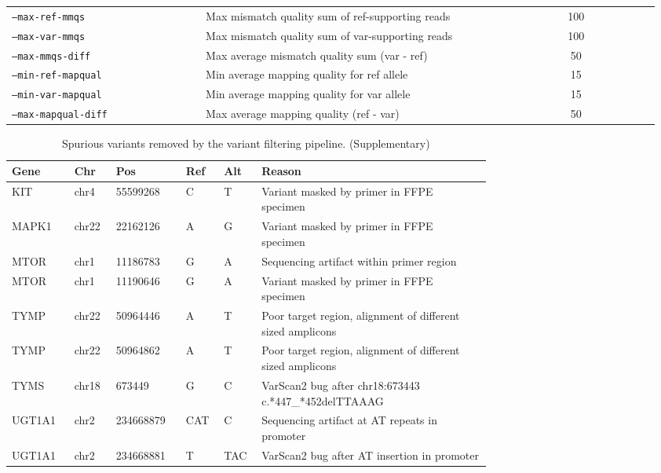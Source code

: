 \documentclass{bmcart}
\begin{document}
\begin{backmatter}
\begin{table}[H]
\begin{tabular}{p{0.3\linewidth}p{0.56\linewidth}cp{0.1\linewidth}}
        \\
        \texttt{--max-ref-mmqs} & Max mismatch quality sum of ref-supporting reads & 100
        \\
        \texttt{--max-var-mmqs} & Max mismatch quality sum of var-supporting reads & 100
        \\
        \texttt{--max-mmqs-diff} & Max average mismatch quality sum (var - ref) & 50
        \\
        \texttt{--min-ref-mapqual} & Min average mapping quality for ref allele & 15
        \\
        \texttt{--min-var-mapqual} & Min average mapping quality for var allele & 15
        \\
        \texttt{--max-mapqual-diff} & Max average mapping quality (ref - var) & 50
        \\
				\hline
      \end{tabular}
\end{table}

\begin{longtable}{p{0.08\linewidth}p{0.05\linewidth}p{0.1\linewidth}p{0.04\linewidth}p{0.04\linewidth}p{0.4\linewidth}}
    \caption{Spurious variants removed by the variant filtering pipeline. (Supplementary)}
    \label{spurious_calls}
        \\
        \hline
        Gene & Chr & Pos & Ref & Alt & Reason
				\\
				\hline
				KIT & chr4 & 55599268 & C & T & Variant masked by primer in FFPE specimen
				\\
        MAPK1 & chr22 & 22162126 & A & G & Variant masked by primer in FFPE specimen
        \\
        MTOR & chr1 & 11186783 & G & A & Sequencing artifact within primer region
        \\
        MTOR & chr1 & 11190646 & G & A & Variant masked by primer in FFPE specimen
        \\
        TYMP & chr22 & 50964446 & A & T & Poor target region, alignment of different sized amplicons
        \\
        TYMP & chr22 & 50964862 & A & T & Poor target region, alignment of different sized amplicons
        \\
        TYMS & chr18 & 673449 & G & C & VarScan2 bug after chr18:673443 c.*447\_*452delTTAAAG
        \\
        UGT1A1 & chr2 & 234668879 & CAT & C & Sequencing artifact at AT repeats in promoter
        \\
        UGT1A1 & chr2 & 234668881 & T & TAC & VarScan2 bug after AT insertion in promoter
        \\
				\hline
\end{longtable}


\end{backmatter}
\end{document}
